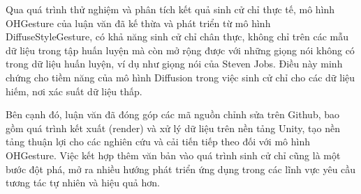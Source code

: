 


Qua quá trình thử nghiệm và phân tích kết quả sinh cử chỉ thực tế, mô hình OHGesture của luận văn đã kế thừa và phát triển từ mô hình DiffuseStyleGesture, có khả năng sinh cử chỉ chân thực, không chỉ trên các mẫu dữ liệu trong tập huấn luyện mà còn mở rộng được với những giọng nói không có trong dữ liệu huấn luyện, ví dụ như giọng nói của Steven Jobs. Điều này minh chứng cho tiềm năng của mô hình Diffusion trong việc sinh cử chỉ cho các dữ liệu hiếm, nơi xác suất dữ liệu thấp.

Bên cạnh đó, luận văn đã đóng góp các mã nguồn chỉnh sửa trên Github, bao gồm quá trình kết xuất (render) và xử lý dữ liệu trên nền tảng Unity, tạo nền tảng thuận lợi cho các nghiên cứu và cải tiến tiếp theo đối với mô hình OHGesture. Việc kết hợp thêm văn bản vào quá trình sinh cử chỉ cũng là một bước đột phá, mở ra nhiều hướng phát triển ứng dụng trong các lĩnh vực yêu cầu tương tác tự nhiên và hiệu quả hơn.


%
%



